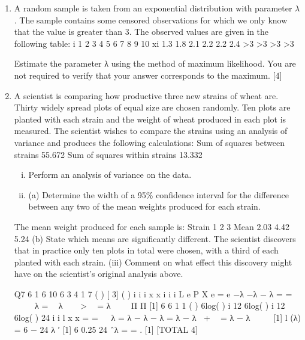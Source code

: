 \documentclass[a4paper,12pt]{article}
\begin{document}
\begin{enumerate}
\item A random sample is taken from an exponential distribution with parameter $\lambda$ . The
sample contains some censored observations for which we only know that the value is
greater than 3. The observed values are given in the following table:
  i 1 2 3 4 5 6 7 8 9 10
xi 1.3 1.8 2.1 2.2 2.2 2.4 >3 >3 >3 >3

Estimate the parameter λ using the method of maximum likelihood. You are not required to verify that your answer corresponds to the maximum. [4]
\item A scientist is comparing how productive three new strains of wheat are. Thirty widely spread plots of equal size are chosen randomly. Ten plots are planted with each strain and the weight of wheat produced in each plot is measured. The scientist
wishes to compare the strains using an analysis of variance and produces the
following calculations:
  Sum of squares between strains 55.672
Sum of squares within strains 13.332
\begin{enumerate}[(i)]
\item Perform an analysis of variance on the data. 
\item  (a) Determine the width of a 95\% confidence interval for the difference
between any two of the mean weights produced for each strain. 
\end{enumerate}
The mean weight produced for each sample is:
  Strain 1 2 3
Mean 2.03 4.42 5.24
(b) State which means are significantly different. 
The scientist discovers that in practice only ten plots in total were chosen, with a third of each planted with each strain.
(iii) Comment on what effect this discovery might have on the scientist’s original analysis above. 

Q7
6
1
6 10
6 3 4
1 7
( ) [ 3] ( )
i
i i
x
x
i
i i
L e P X e = e
−λ
−λ − λ
= =
      
λ =  λ   >  = λ
  
Π Π [1]
6 6
1 1
( ) 6log( ) i 12 6log( ) i 12 6log( ) 24
i i
l x x
= =
   
λ = λ − λ − λ = λ − λ +  = λ − λ
 
  [1]
l (λ) = 6 − 24
λ
′ [1]
6 0.25
24
ˆλ = = . [1]
[TOTAL 4]
\newpage


\end{enumerate}
\end{document}
